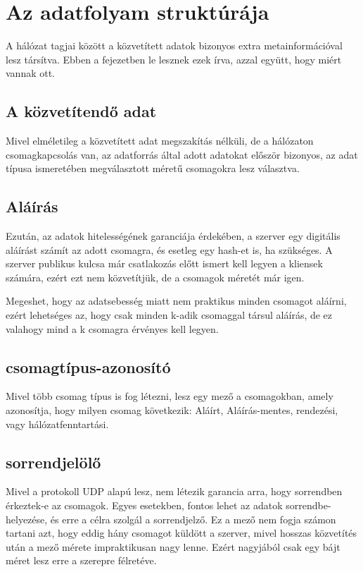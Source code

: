\chapter{Az adatfolyam strukt\'ur\'aja}

A hálózat tagjai között a közvetített adatok bizonyos extra
metainformációval lesz társítva. Ebben a fejezetben le lesznek ezek írva,
azzal együtt, hogy miért vannak ott.

\section{A közvetítendő adat}

Mivel elméletileg a közvetített adat megszakítás nélküli, de a hálózaton
csomagkapcsolás van, az adatforrás által adott adatokat először bizonyos,
az adat típusa ismeretében megválasztott méretű csomagokra lesz választva.

\section{Aláírás}

Ezután, az adatok hitelességének garanciája érdekében, a szerver egy
digitális aláírást számít az adott csomagra, és esetleg egy hash-et is,
ha szükséges. A szerver publikus kulcsa már csatlakozás előtt ismert kell
legyen a kliensek számára, ezért ezt nem közvetítjük, de a csomagok
méretét már igen.

Megeshet, hogy az adatsebesség miatt nem praktikus minden csomagot
aláírni, ezért lehetséges az, hogy csak minden k-adik csomaggal társul
aláírás, de ez valahogy mind a k csomagra érvényes kell legyen.

\section{csomagtípus-azonosító}

Mivel több csomag típus is fog létezni, lesz egy mező a csomagokban,
amely azonosítja, hogy milyen csomag következik: Aláírt, Aláírás-mentes,
rendezési, vagy hálózatfenntartási.

\section{sorrendjelölő}

Mivel a protokoll UDP alapú lesz, nem létezik garancia arra, hogy
sorrendben érkeztek-e az csomagok. Egyes esetekben, fontos lehet az
adatok sorrendbe-helyezése, és erre a célra szolgál a sorrendjelző. 
Ez a mező nem fogja számon tartani azt, hogy eddig hány csomagot küldött
a szerver, mivel hosszas közvetítés után a mező mérete impraktikusan nagy
lenne. Ezért nagyjából csak egy bájt méret lesz erre a szerepre
félretéve.
